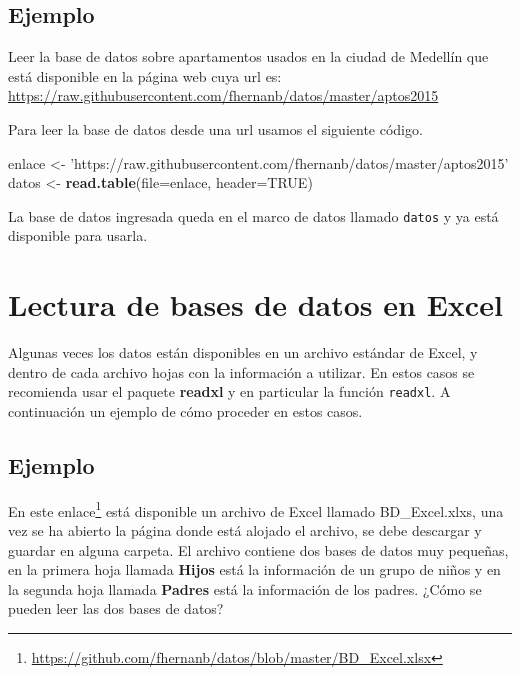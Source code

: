 \documentclass[10pt,]{krantz}
\makeatletter
\newenvironment{Shaded}{\begin{snugshade}}{\end{snugshade}}
\newcommand{\KeywordTok}[1]{\textcolor[rgb]{0.13,0.29,0.53}{\textbf{{#1}}}}
\newcommand{\DataTypeTok}[1]{\textcolor[rgb]{0.13,0.29,0.53}{{#1}}}
\newcommand{\StringTok}[1]{\textcolor[rgb]{0.31,0.60,0.02}{{#1}}}
\newcommand{\OtherTok}[1]{\textcolor[rgb]{0.56,0.35,0.01}{{#1}}}
\newcommand{\NormalTok}[1]{{#1}}
\renewcommand{\href}[2]{#2\footnote{\url{#1}}}
\newenvironment{kframe}{%
\medskip{}
\setlength{\fboxsep}{.8em}
 \def\at@end@of@kframe{}%
 \ifinner\ifhmode%
  \def\at@end@of@kframe{\end{minipage}}%
  \begin{minipage}{\columnwidth}%
 \fi\fi%
 \def\FrameCommand##1{\hskip\@totalleftmargin \hskip-\fboxsep
 \colorbox{shadecolor}{##1}\hskip-\fboxsep
     \hskip-\linewidth \hskip-\@totalleftmargin \hskip\columnwidth}%
 \MakeFramed {\advance\hsize-\width
   \@totalleftmargin\z@ \linewidth\hsize
   \@setminipage}}%
 {\par\unskip\endMakeFramed%
 \at@end@of@kframe}
\renewenvironment{Shaded}{\begin{kframe}}{\end{kframe}}
\makeatother
\begin{document}
\subsection*{Ejemplo}\label{ejemplo-25}


Leer la base de datos sobre apartamentos usados en la ciudad de Medellín
que está disponible en la página web cuya url es:
\url{https://raw.githubusercontent.com/fhernanb/datos/master/aptos2015}

Para leer la base de datos desde una url usamos el siguiente código.

\begin{Shaded}
\begin{Highlighting}[]
\NormalTok{enlace <-}\StringTok{ 'https://raw.githubusercontent.com/fhernanb/datos/master/aptos2015'}
\NormalTok{datos <-}\StringTok{ }\KeywordTok{read.table}\NormalTok{(}\DataTypeTok{file=}\NormalTok{enlace, }\DataTypeTok{header=}\OtherTok{TRUE}\NormalTok{)}
\end{Highlighting}
\end{Shaded}

La base de datos ingresada queda en el marco de datos llamado
\texttt{datos} y ya está disponible para usarla.

\section{Lectura de bases de datos en
Excel}\label{lectura-de-bases-de-datos-en-excel}

Algunas veces los datos están disponibles en un archivo estándar de
Excel, y dentro de cada archivo hojas con la información a utilizar. En
estos casos se recomienda usar el paquete \textbf{readxl}
\citep{R-readxl} y en particular la función \texttt{readxl}. A
continuación un ejemplo de cómo proceder en estos casos.

\subsection*{Ejemplo}\label{ejemplo-26}


En este
\href{https://github.com/fhernanb/datos/blob/master/BD_Excel.xlsx}{enlace}
está disponible un archivo de Excel llamado BD\_Excel.xlxs, una vez se
ha abierto la página donde está alojado el archivo, se debe descargar y
guardar en alguna carpeta. El archivo contiene dos bases de datos muy
pequeñas, en la primera hoja llamada \textbf{Hijos} está la información
de un grupo de niños y en la segunda hoja llamada \textbf{Padres} está
la información de los padres. ¿Cómo se pueden leer las dos bases de
datos?
\end{document}
